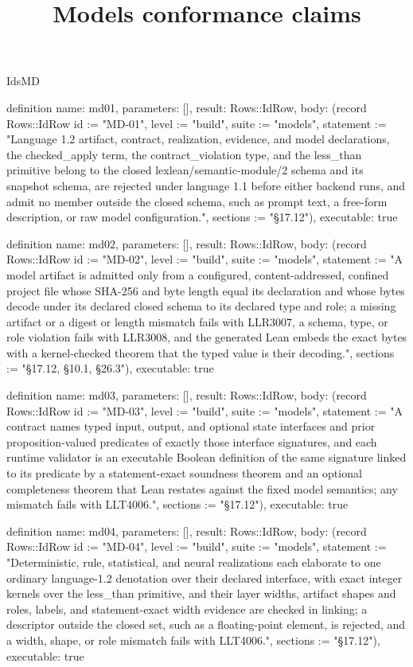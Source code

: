 \begin{lexlean}{IdsMD}
\title{Models conformance claims}
\begin{semanticmodule}
definition{
  name: md01,
  parameters: [],
  result: Rows::IdRow,
  body: (record Rows::IdRow {id := "MD-01", level := "build", suite := "models", statement := "Language 1.2 artifact, contract, realization, evidence, and model declarations, the checked_apply term, the contract_violation type, and the less_than primitive belong to the closed lexlean/semantic-module/2 schema and its snapshot schema, are rejected under language 1.1 before either backend runs, and admit no member outside the closed schema, such as prompt text, a free-form description, or raw model configuration.", sections := "§17.12"}),
  executable: true
}

definition{
  name: md02,
  parameters: [],
  result: Rows::IdRow,
  body: (record Rows::IdRow {id := "MD-02", level := "build", suite := "models", statement := "A model artifact is admitted only from a configured, content-addressed, confined project file whose SHA-256 and byte length equal its declaration and whose bytes decode under its declared closed schema to its declared type and role; a missing artifact or a digest or length mismatch fails with LLR3007, a schema, type, or role violation fails with LLR3008, and the generated Lean embeds the exact bytes with a kernel-checked theorem that the typed value is their decoding.", sections := "§17.12, §10.1, §26.3"}),
  executable: true
}

definition{
  name: md03,
  parameters: [],
  result: Rows::IdRow,
  body: (record Rows::IdRow {id := "MD-03", level := "build", suite := "models", statement := "A contract names typed input, output, and optional state interfaces and prior proposition-valued predicates of exactly those interface signatures, and each runtime validator is an executable Boolean definition of the same signature linked to its predicate by a statement-exact soundness theorem and an optional completeness theorem that Lean restates against the fixed model semantics; any mismatch fails with LLT4006.", sections := "§17.12"}),
  executable: true
}

definition{
  name: md04,
  parameters: [],
  result: Rows::IdRow,
  body: (record Rows::IdRow {id := "MD-04", level := "build", suite := "models", statement := "Deterministic, rule, statistical, and neural realizations each elaborate to one ordinary language-1.2 denotation over their declared interface, with exact integer kernels over the less_than primitive, and their layer widths, artifact shapes and roles, labels, and statement-exact width evidence are checked in linking; a descriptor outside the closed set, such as a floating-point element, is rejected, and a width, shape, or role mismatch fails with LLT4006.", sections := "§17.12"}),
  executable: true
}


\end{semanticmodule}
\end{lexlean}
